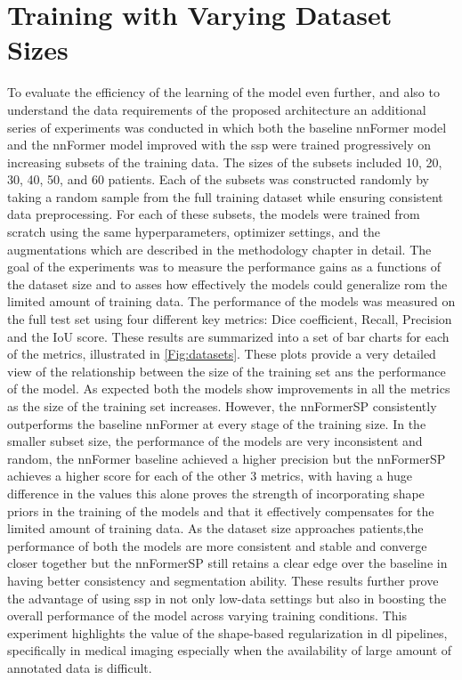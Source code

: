 \section{Training with Varying Dataset Sizes}
To evaluate the efficiency of the learning of the model even further, and also to understand the data requirements of the proposed architecture an additional series of experiments was conducted in which both the baseline nnFormer model and the nnFormer model improved with the \gls{ssp} were trained progressively on increasing subsets of the training data. The sizes of the subsets included 10, 20, 30, 40, 50, and 60 patients. Each of the subsets was constructed randomly by taking a random sample from the full training dataset while ensuring consistent data preprocessing. For each of these subsets, the models were trained from scratch using the same hyperparameters, optimizer settings, and the augmentations which are described in the methodology chapter in detail. The goal of the experiments was to measure the performance gains as a functions of the dataset size and to asses how effectively the models could generalize rom the limited amount of training data. The performance of the models was measured on the full test set using four different key metrics: Dice coefficient, Recall, Precision and the IoU score. These results are summarized into a set of bar charts for each of the metrics, illustrated in \cref{Fig:datasets}. These plots provide a very detailed view of the relationship between the size of the training set ans the performance of the model. As expected both the models show improvements in all the metrics as the size of the training set increases. However, the nnFormerSP consistently outperforms the baseline nnFormer at every stage of the training size. In the smaller subset size, the performance of the models are very inconsistent and random, the nnFormer baseline achieved a higher precision but the nnFormerSP achieves a higher score for each of the other 3 metrics, with having a huge difference in the values this alone proves the strength of incorporating shape priors in the training of the models and that it effectively compensates for the limited amount of training data. As the dataset size approaches patients,the performance of both the models are more consistent and stable and converge closer together but the nnFormerSP still retains a clear edge over the baseline in having better consistency and segmentation ability. These results further prove the advantage of using \gls{ssp} in not only low-data settings but also in boosting the overall performance of the model across varying training conditions. This experiment highlights the value of the shape-based regularization in \gls{dl} pipelines, specifically in medical imaging especially when the availability of large amount of annotated data is difficult.

